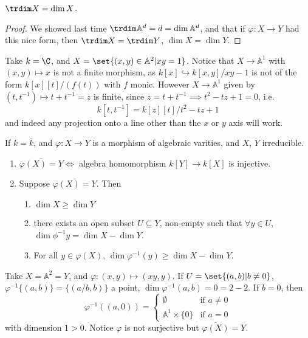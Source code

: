 \documentclass{article}
\newcommand{\A}{\mathbb{A}}
\begin{document}
\begin{cor}
    $\trdim X = \dim X$.
\end{cor}
\begin{proof}
    We showed last time $\trdim \A^d = d = \dim \A^d$, and that if $\varphi: X \to Y$ had this nice form, then $\trdim X = \trdim Y$, $\dim X = \dim Y$.
\end{proof}
\begin{eg}
    Take $k = \C$, and $X = \set{(x, y) \in \A^2 | x y = 1}$. Notice that $X \to \A^1$ with $(x, y) \mapsto x$ is not a finite morphism, as $k[x] \hookrightarrow k[x, y] /xy-1$ is not of the form $k[x][t]/(f(t))$ with $f$ monic.
    However $X \to \A^1$ given by $(t, t^{-1}) \mapsto t + t^{-1} = z$ is finite, since $z = t+t^{-1} \implies t^2 - tz + 1 = 0$, i.e.\
    \begin{equation}
        k[t, t^{-1}] = k[z][t]/t^2-tz+1
    \end{equation}
    and indeed any projection onto a line other than the $x$ or $y$ axis will work.
\end{eg}
\begin{thm}
    If $k = \overline{k}$, and $\varphi: X \to Y$ is a morphism of algebraic varities, and $X$, $Y$ irreducible.
    \begin{enumerate}[label=(\alph*)]
        \item $\overline{\varphi(X) = Y} \iff$ algebra homomorphism $k[Y] \to k[X]$ is injective.
        \item Suppose $\overline{\varphi(X) = Y}$. Then
            \begin{enumerate}[label=(\roman*)]
                \item $\dim X \geq \dim Y$
                \item there exists an open subset $U \subseteq Y$, non-empty such that $\forall y \in U$, $\dim \phi^{-1} y = \dim X - \dim Y$.
                \item For all $y \in \varphi(X)$, $\dim \varphi^{-1}(y) \geq \dim X - \dim Y$.
            \end{enumerate}
    \end{enumerate}
\end{thm}
\begin{eg}
    Take $X = \A^2 = Y$, and $\varphi: (x, y) \mapsto (xy, y)$.
    If $U = \set{(a, b) | b \neq 0}$, $\varphi^{-1}\{(a, b)\} = \{(a/b, b)\}$ a point, $\dim \varphi^{-1}(a, b) = 0 = 2- 2$.
    If $b = 0$, then
    \begin{equation}
        \varphi^{-1}((a, 0)) =
        \begin{cases}
            \emptyset & \text{if } a \neq 0 \\
            \A^1 \times \{0\} & \text{if } a = 0
        \end{cases}
    \end{equation}
    with dimension $1 > 0$. Notice $\varphi$ is not surjective but $\overline{\varphi(X)} = Y$.
\end{eg}
\end{document}
